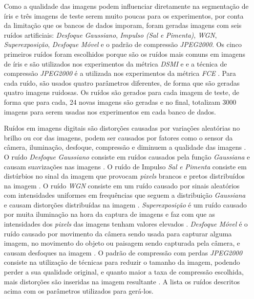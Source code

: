 \par Como a qualidade das imagens podem influenciar diretamente na segmentação de íris e três imagens de teste serem muito poucas para os experimentos, por conta da limitação que os bancos de dados imporam, foram geradas imagens com seis ruídos artificiais: \textit{Desfoque Gaussiano}, \textit{Impulso (Sal e Pimenta)}, \textit{\acrfull{WGN}}, \textit{Superexposição}, \textit{Desfoque Móvel} e o padrão de compressão \textit{JPEG2000}. Os cinco primeiros ruídos foram escolhidos porque são os ruídos mais comuns em imagens de íris e são utilizados nos experimentos da métrica \textit{\acrshort{DSMI}} e \cite{Jenadeleh_2018_CVPR_Workshops} e a técnica de compressão \textit{JPEG2000} é a utilizada nos experimentos da métrica \textit{\acrshort{FCE}} \cite{du2010}. Para cada ruído, são usados quatro parâmetros diferentes, de forma que são geradas quatro imagens ruidosas. Os ruídos são gerados para cada imagem de teste, de forma que para cada, 24 novas imagens são geradas e no final, totalizam 3000 imagens para serem usadas nos experimentos em cada banco de dados.

\par Ruídos em imagens digitais são distorções causadas por variações aleatórias no brilho ou cor das imagens, podem ser causados por fatores como o sensor da câmera, iluminação, desfoque, compressão e diminuem a qualidade das imagens \cite{gonsalez2006}. O ruído \textit{Desfoque Gaussiano} consiste em ruídos causados pela função \textit{Gaussiana} e causam suavizações nas imagens \cite{gonsalez2006, boyat2015review}. O ruído de Impulso \textit{Sal e Pimenta} consiste em distúrbios no sinal da imagem que provocam \textit{pixels} brancos e pretos distribuídos na imagem \cite{gonsalez2006, boyat2015review}. O ruído \textit{\acrshort{WGN}} consiste em um ruído causado por sinais aleatórios com intensidades uniformes em frequências que seguem a distribuição \textit{Gaussiana} e causam distorções distribuídas na imagem \cite{boyat2015review}. \textit{Superexposição} é um ruído causado por muita iluminação na hora da captura de imagens e faz com que as intensidades dos \textit{pixels} das imagens tenham valores elevados \cite{overexposure}. \textit{Desfoque Móvel} é o ruído causado por movimento da câmera sendo usada para capturar alguma imagem, no movimento do objeto ou paisagem sendo capturada pela câmera, e causam desfoques na imagem \cite{jiang2005motion}. O padrão de compressão com perdas \textit{JPEG2000} consiste na utilização de técnicas para reduzir o tamanho da imagem, podendo perder a sua qualidade original, e quanto maior a taxa de compressão escolhida, mais distorções são inseridas na imagem resultante \cite{marcellin2000-jpeg2000}. A  lista os ruídos descritos acima com os parâmetros utilizados para gerá-los.


